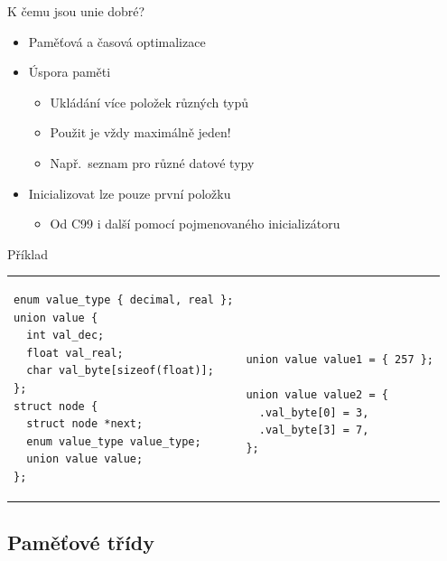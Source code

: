 \begin{frame}[fragile]{K čemu jsou unie dobré?}

  \begin{itemize}
    \item Paměťová a časová optimalizace
    \item Úspora paměti
    \begin{itemize}
      \item Ukládání více položek různých typů
      \item Použit je vždy maximálně jeden!

      \pause

      \item Např.\ seznam pro různé datové typy
    \end{itemize}

    \pause

    \item Inicializovat lze pouze první položku
    \begin{itemize}
      \item Od C99 i další pomocí pojmenovaného inicializátoru
    \end{itemize}

  \end{itemize}


\begin{block}{Příklad}
\begin{tabular}{ll}
\begin{lstlisting}
enum value_type { decimal, real };
union value {
  int val_dec;
  float val_real;
  char val_byte[sizeof(float)];
};
struct node {
  struct node *next;
  enum value_type value_type;
  union value value;
};
\end{lstlisting}
& ~~~~~~
\begin{lstlisting}
union value value1 = { 257 };

union value value2 = {
  .val_byte[0] = 3,
  .val_byte[3] = 7,
};
\end{lstlisting}
\end{tabular}
\end{block}

\end{frame}

\subsection*{Paměťové třídy}
\frame{\subsectionpage}

